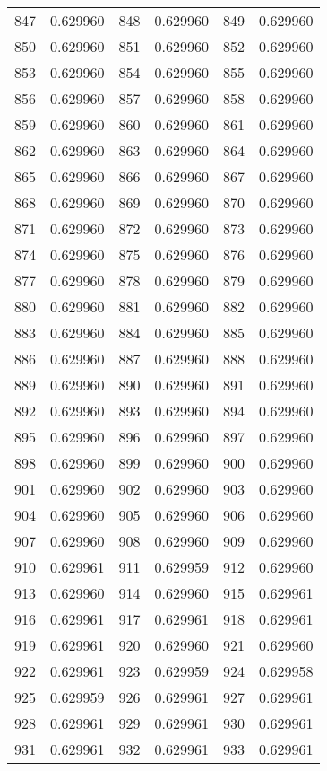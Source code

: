 \documentclass[12pt]{article}
\begin{document}
\begin{longtable}{@{}cc|cc|cc@{}}
847 & 0.629960 & 848 & 0.629960 & 849 & 0.629960 \\
850 & 0.629960 & 851 & 0.629960 & 852 & 0.629960 \\
853 & 0.629960 & 854 & 0.629960 & 855 & 0.629960 \\
856 & 0.629960 & 857 & 0.629960 & 858 & 0.629960 \\
859 & 0.629960 & 860 & 0.629960 & 861 & 0.629960 \\
862 & 0.629960 & 863 & 0.629960 & 864 & 0.629960 \\
865 & 0.629960 & 866 & 0.629960 & 867 & 0.629960 \\
868 & 0.629960 & 869 & 0.629960 & 870 & 0.629960 \\
871 & 0.629960 & 872 & 0.629960 & 873 & 0.629960 \\
874 & 0.629960 & 875 & 0.629960 & 876 & 0.629960 \\
877 & 0.629960 & 878 & 0.629960 & 879 & 0.629960 \\
880 & 0.629960 & 881 & 0.629960 & 882 & 0.629960 \\
883 & 0.629960 & 884 & 0.629960 & 885 & 0.629960 \\
886 & 0.629960 & 887 & 0.629960 & 888 & 0.629960 \\
889 & 0.629960 & 890 & 0.629960 & 891 & 0.629960 \\
892 & 0.629960 & 893 & 0.629960 & 894 & 0.629960 \\
895 & 0.629960 & 896 & 0.629960 & 897 & 0.629960 \\
898 & 0.629960 & 899 & 0.629960 & 900 & 0.629960 \\
901 & 0.629960 & 902 & 0.629960 & 903 & 0.629960 \\
904 & 0.629960 & 905 & 0.629960 & 906 & 0.629960 \\
907 & 0.629960 & 908 & 0.629960 & 909 & 0.629960 \\
910 & 0.629961 & 911 & 0.629959 & 912 & 0.629960 \\
913 & 0.629960 & 914 & 0.629960 & 915 & 0.629961 \\
916 & 0.629961 & 917 & 0.629961 & 918 & 0.629961 \\
919 & 0.629961 & 920 & 0.629960 & 921 & 0.629960 \\
922 & 0.629961 & 923 & 0.629959 & 924 & 0.629958 \\
925 & 0.629959 & 926 & 0.629961 & 927 & 0.629961 \\
928 & 0.629961 & 929 & 0.629961 & 930 & 0.629961 \\
931 & 0.629961 & 932 & 0.629961 & 933 & 0.629961 \\

\end{longtable}
\end{document}
